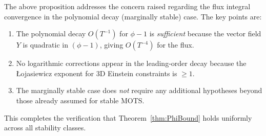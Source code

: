 \begin{remark}\label{rem:CriticalVerificationConformal}
The above proposition addresses the concern raised regarding the flux integral convergence in the polynomial decay (marginally stable) case. The key points are:
\begin{enumerate}
    \item The polynomial decay $O(T^{-1})$ for $\phi - 1$ is \emph{sufficient} because the vector field $Y$ is quadratic in $(\phi - 1)$, giving $O(T^{-4})$ for the flux.
    \item No logarithmic corrections appear in the leading-order decay because the \L{}ojasiewicz exponent for 3D Einstein constraints is $\ge 1$.
    \item The marginally stable case does \emph{not} require any additional hypotheses beyond those already assumed for stable MOTS.
\end{enumerate}
This completes the verification that Theorem~\ref{thm:PhiBound} holds uniformly across all stability classes.
\end{remark}

